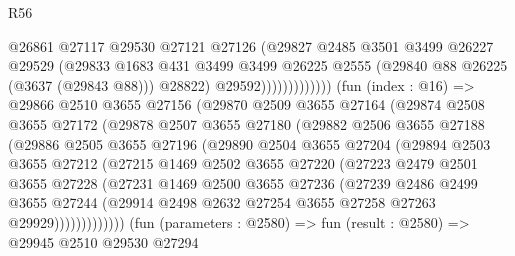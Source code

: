 \begin{lexlean}{R56}
\begin{coremodule}
                                @26861
                                @27117
                                @29530
                                @27121
                                @27126
                                (@29827
                                  @2485
                                  @3501
                                  @3499
                                  @26227
                                  @29529
                                  (@29833
                                    @1683
                                    @431
                                    @3499
                                    @3499
                                    @26225
                                    @2555
                                    (@29840 @88 @26225 (@3637 (@29843 @88)))
                                    @28822)
                                  @29592)))))))))))))
        (fun (index : @16) =>
        @29866
          @2510
          @3655
          @27156
          (@29870
            @2509
            @3655
            @27164
            (@29874
              @2508
              @3655
              @27172
              (@29878
                @2507
                @3655
                @27180
                (@29882
                  @2506
                  @3655
                  @27188
                  (@29886
                    @2505
                    @3655
                    @27196
                    (@29890
                      @2504
                      @3655
                      @27204
                      (@29894
                        @2503
                        @3655
                        @27212
                        (@27215
                          @1469
                          @2502
                          @3655
                          @27220
                          (@27223
                            @2479
                            @2501
                            @3655
                            @27228
                            (@27231
                              @1469
                              @2500
                              @3655
                              @27236
                              (@27239
                                @2486
                                @2499
                                @3655
                                @27244
                                (@29914 @2498 @2632 @27254 @3655 @27258 @27263 @29929)))))))))))))
        (fun (parameters : @2580) =>
        fun (result : @2580) =>
        @29945
          @2510
          @29530
          @27294

\end{coremodule}
\end{lexlean}
